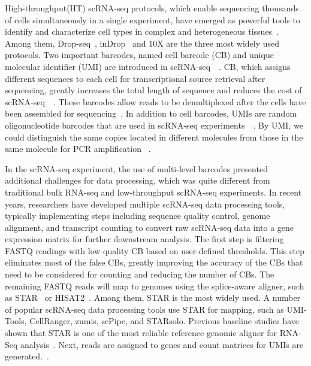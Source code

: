 \documentclass[conference]{IEEEtran}
\begin{document}
High-throughput(HT) scRNA-seq protocols, which enable sequencing thousands of cells simultaneously in a single experiment, have emerged as powerful tools to identify and characterize cell types in complex and heterogeneous tissues~\cite{Zhang2019ComparativeAO}.
Among them, Drop-seq~\cite{Macosko2015HighlyPG}, inDrop~\cite{Klein2015DropletBF} and 10X\cite{Zheng2017Massively} are the three most widely used protocols. 
Two important barcodes, named cell barcode (CB) and unique molecular identifier (UMI) are introduced in scRNA-seq~\cite{Rosenberg2018SinglecellPO}~\cite{Cao2017ComprehensiveSC}. 
CB, which assigns different sequences to each cell for transcriptional source retrieval after sequencing, greatly increases the total length of sequence and reduces the cost of scRNA-seq~\cite{Macosko2015HighlyPG}~\cite{Klein2015DropletBF}. 
These barcodes allow reads to be demultiplexed after the cells have been assembled for sequencing~\cite{Tian2018scPipe}.
In addition to cell barcodes, UMIs are random oligonucleotide barcodes that are used in scRNA-seq experiments~\cite{Kivioja2012Counting}~\cite{Camara2017Methods}.
By UMI, we could distinguish the same copies located in different molecules from those in the same molecule for PCR amplification ~\cite{Smith2017UMItools}.

In the scRNA-seq experiment, the use of multi-level barcodes presented additional challenges for data processing, which was quite different from traditional bulk RNA-seq and low-throughput scRNA-seq experiments. 
In recent years, researchers have developed multiple scRNA-seq data processing tools, typically implementing steps including sequence quality control, genome alignment, and transcript counting to convert raw scRNA-seq data into a gene expression matrix for further downstream analysis. 
The first step is filtering FASTQ readings with low quality CB based on user-defined thresholds. 
This step eliminates most of the false CBs, greatly improving the accuracy of the CBs that need to be considered for counting and reducing the number of CBs. 
The remaining FASTQ reads will map to genomes using the splice-aware aligner, such as STAR~\cite{Dobin2013STAR} or HISAT2~\cite{Kim2015HISAT}. 
Among them, STAR is the most widely used. A number of popular scRNA-seq data processing tools use STAR for mapping, such as UMI-Tools, CellRanger, zumis, scPipe, and STARsolo. 
Previous baseline studies have shown that STAR is one of the most reliable reference genomic aligner for RNA-Seq analysis~\cite{Baruzzo2017SimulationbasedCB}. 
Next, reads are assigned to genes and count matrices for UMIs are generated.~\cite{Parekh2018zUMIs}. 
\end{document}
